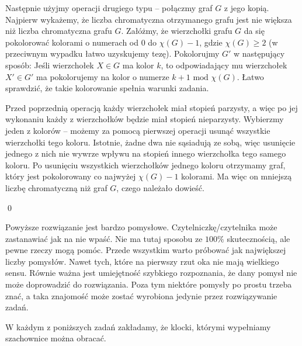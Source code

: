 \vspace{10px}
\noindent
Następnie użyjmy operacji drugiego typu -- połączmy graf $G$ z jego kopią. Najpierw wykażemy, że liczba chromatyczna otrzymanego grafu jest nie większa niż liczba chromatyczna grafu $G$. Załóżmy, że wierzchołki grafu $G$ da się pokolorować kolorami o numerach od $0$ do $\chi(G) - 1$, gdzie $\chi(G) \geqslant 2$ (w przeciwnym wypadku łatwo uzyskujemy tezę). Pokolorujmy $G'$ w następujący sposób: 
Jeśli wierzchołek $X \in G$ ma kolor $k$, to odpowiadający mu wierzchołek $X' \in G'$ ma pokolorujemy na kolor o numerze $k + 1 \text{ mod } \chi(G)$. Łatwo sprawdzić, że takie kolorowanie spełnia warunki zadania.

\vspace{10px}
\noindent
Przed poprzednią operacją każdy wierzchołek miał stopień parzysty, a więc po jej wykonaniu każdy z wierzchołków będzie miał stopień nieparzysty. Wybierzmy jeden z kolorów -- możemy za pomocą pierwszej operacji usunąć wszystkie wierzchołki tego koloru. Istotnie, żadne dwa nie sąsiadują ze sobą, więc usunięcie jednego z nich nie wywrze wpływu na stopień innego wierzchołka tego samego koloru. Po usunięciu wszystkich wierzchołków jednego koloru otrzymamy graf, który jest pokolorowany co najwyżej $\chi(G) - 1$ kolorami. Ma więc on mniejszą liczbę chromatyczną niż graf $G$, czego należało dowieść.

\qed

\noindent
Powyższe rozwiązanie jest bardzo pomysłowe. Czytelniczkę/czytelnika może zastanawiać jak na nie wpaść. Nie ma tutaj sposobu ze $100\%$ skutecznością, ale pewne rzeczy mogą pomóc. Przede wszystkim warto próbować jak największej liczby pomysłów. Nawet tych, które na pierwszy rzut oka nie mają wielkiego sensu. Równie ważna jest umiejętność szybkiego rozpoznania, że dany pomysł nie może doprowadzić do rozwiązania. Poza tym niektóre pomysły po prostu trzeba znać, a taka znajomość może zostać wyrobiona jedynie przez rozwiązywanie zadań.

\vspace{10px}
\begin{remark}
W każdym z poniższych zadań zakładamy, że klocki, którymi wypełniamy szachownice można obracać.
\end{remark}
\vspace{5px}
